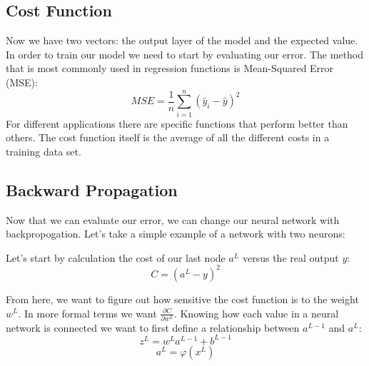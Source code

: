 \documentclass[12pt]{article}
\begin{document}
\vspace{-2ex}
\vspace{-3ex}
\subsection*{Cost Function}
\vspace{-3ex}
Now we have two vectors: the output layer of the model and the expected value. In order to train our model we need to start by evaluating our error. The method that is most commonly used in regression functions is Mean-Squared Error (MSE):
$$
MSE=\frac{1}{n}\sum_{i=1}^{n}(\hat{y}_i-\hat{y})^2
$$
\vspace{0ex}
For different applications there are specific functions that perform better than others. The cost function itself is the average of all the different costs in a training data set. 

\subsection*{Backward Propagation}
Now that we can evaluate our error, we can change our neural network with backpropogation. Let's take a simple example of a network with two neurons:

 \begin{center}
	
\end{center}
 
 Let's start by calculation the cost of our last node $a^L$ versus the real output $y$:
 $$
 C = (a^L-y)^2
 $$
 
 From here, we want to figure out how sensitive the cost function is to the weight $w^L$. In more formal terms we want $\frac{\partial C}{\partial w^L}$. Knowing how each value in a neural network is connected we want to first define a relationship between $a^{L-1}$ and $a^L$:
 $$
 z^{L} = w^{L}a^{L-1}+b^{L-1}
 $$
 $$
 a^{L} = \varphi (x^L)
 $$
 
\end{document}
